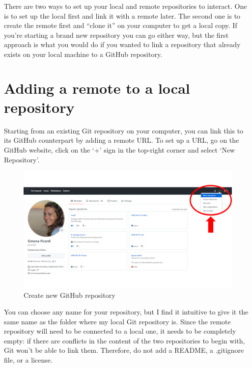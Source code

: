 \documentclass[
]{book}
\begin{document}
There are two ways to set up your local and remote repositories to interact. One is to set up the local first and link it with a remote later. The second one is to create the remote first and ``clone it'' on your computer to get a local copy. If you're starting a brand new repository you can go either way, but the first approach is what you would do if you wanted to link a repository that already exists on your local machine to a GitHub repository.

\hypertarget{adding-a-remote-to-a-local-repository}{%
\section{Adding a remote to a local repository}\label{adding-a-remote-to-a-local-repository}}

Starting from an existing Git repository on your computer, you can link this to its GitHub counterpart by adding a remote URL. To set up a URL, go on the GitHub website, click on the `+' sign in the top-right corner and select `New Repository'.

\begin{figure}

{\centering \includegraphics[width=1\linewidth]{img/github-01} 

}

\caption{Create new GitHub repository}\label{fig:github01}
\end{figure}

You can choose any name for your repository, but I find it intuitive to give it the same name as the folder where my local Git repository is. Since the remote repository will need to be connected to a local one, it needs to be completely empty: if there are conflicts in the content of the two repositories to begin with, Git won't be able to link them. Therefore, do not add a README, a .gitignore file, or a license.
\end{document}

